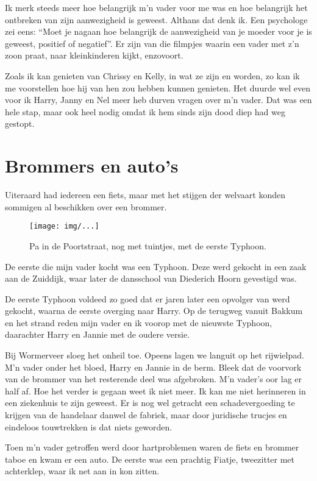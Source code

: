 \documentclass[10pt,twoside,openright]{memoir}
\begin{document}
Ik merk steeds meer hoe belangrijk m'n vader voor me was en hoe belangrijk het ontbreken van zijn aanwezigheid is geweest. Althans dat denk ik. Een psychologe zei eens: ``Moet je nagaan hoe belangrijk de aanwezigheid van je moeder voor je is geweest, positief of negatief''. Er zijn van die filmpjes waarin een vader met z'n zoon praat, naar kleinkinderen kijkt, enzovoort.

Zoals ik kan genieten van Chrissy en Kelly, in wat ze zijn en worden, zo kan ik me voorstellen hoe hij van hen zou hebben kunnen genieten. Het duurde wel even voor ik Harry, Janny en Nel meer heb durven vragen over m'n vader. Dat was een hele stap, maar ook heel nodig omdat ik hem sinds zijn dood diep had weg gestopt. 

\chapter{Brommers en auto's} %
\label{cha:brommers_autos}

Uiteraard had iedereen een fiets, maar met het stijgen der welvaart konden sommigen al beschikken over een brommer. 

\begin{figure}[t]
\texttt{[image: img/...]}
\caption{Pa in de Poortstraat, nog met tuintjes, met de eerste Typhoon.}
\end{figure}

De eerste die mijn vader kocht was een Typhoon. Deze werd gekocht in een zaak aan de Zuiddijk, waar later de dansschool van Diederich Hoorn gevestigd was. 

De eerste Typhoon voldeed zo goed dat er jaren later een opvolger van werd gekocht, waarna de eerste overging naar Harry. Op de terugweg vanuit Bakkum en het strand reden mijn vader en ik voorop met de nieuwste Typhoon, daarachter Harry en Jannie met de oudere versie. 

Bij Wormerveer sloeg het onheil toe. Opeens lagen we languit op het rijwielpad. M'n vader onder het bloed, Harry en Jannie in de berm. Bleek dat de voorvork van de brommer van het resterende deel was afgebroken. M'n vader's oor lag er half af. Hoe het verder is gegaan weet ik niet meer. Ik kan me niet herinneren in een ziekenhuis te zijn geweest. Er is nog wel getracht een schadevergoeding te krijgen van de handelaar danwel de fabriek, maar door juridische trucjes en eindeloos touwtrekken is dat niets geworden. 

Toen m'n vader getroffen werd door hartproblemen waren de fiets en brommer taboe en kwam er een auto. De eerste was een prachtig Fiatje, tweezitter met achterklep, waar ik net aan in kon zitten. 
\end{document}
